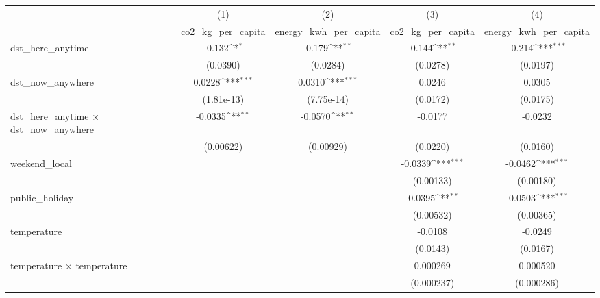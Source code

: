 {
\def\sym#1{\ifmmode^{#1}\else\(^{#1}\)\fi}
\begin{tabular}{l*{4}{c}}
\hline\hline
                    &\multicolumn{1}{c}{(1)}&\multicolumn{1}{c}{(2)}&\multicolumn{1}{c}{(3)}&\multicolumn{1}{c}{(4)}\\
                    &\multicolumn{1}{c}{co2\_kg\_per\_capita}&\multicolumn{1}{c}{energy\_kwh\_per\_capita}&\multicolumn{1}{c}{co2\_kg\_per\_capita}&\multicolumn{1}{c}{energy\_kwh\_per\_capita}\\
\hline
dst\_here\_anytime    &      -0.132\sym{*}  &      -0.179\sym{**} &      -0.144\sym{**} &      -0.214\sym{***}\\
                    &    (0.0390)         &    (0.0284)         &    (0.0278)         &    (0.0197)         \\
[1em]
dst\_now\_anywhere    &      0.0228\sym{***}&      0.0310\sym{***}&      0.0246         &      0.0305         \\
                    &  (1.81e-13)         &  (7.75e-14)         &    (0.0172)         &    (0.0175)         \\
[1em]
dst\_here\_anytime $\times$ dst\_now\_anywhere&     -0.0335\sym{**} &     -0.0570\sym{**} &     -0.0177         &     -0.0232         \\
                    &   (0.00622)         &   (0.00929)         &    (0.0220)         &    (0.0160)         \\
[1em]
weekend\_local       &                     &                     &     -0.0339\sym{***}&     -0.0462\sym{***}\\
                    &                     &                     &   (0.00133)         &   (0.00180)         \\
[1em]
public\_holiday      &                     &                     &     -0.0395\sym{**} &     -0.0503\sym{***}\\
                    &                     &                     &   (0.00532)         &   (0.00365)         \\
[1em]
temperature         &                     &                     &     -0.0108         &     -0.0249         \\
                    &                     &                     &    (0.0143)         &    (0.0167)         \\
[1em]
temperature $\times$ temperature&                     &                     &    0.000269         &    0.000520         \\
                    &                     &                     &  (0.000237)         &  (0.000286)         \\

\end{tabular}}
